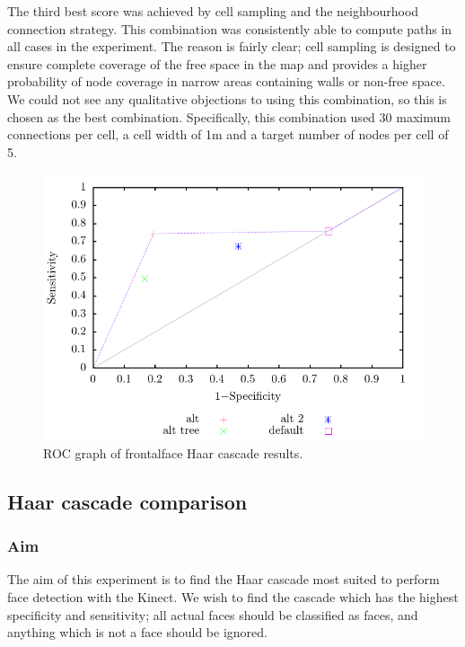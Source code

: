 \documentclass[conference]{IEEEtran}
\begin{document}
The third best score was achieved by cell sampling and the neighbourhood connection strategy. This combination was consistently able to compute paths in all cases in the experiment. The reason is fairly clear; cell sampling is designed to ensure complete coverage of the free space in the map and provides a higher probability of node coverage in narrow areas containing walls or non-free space. We could not see any qualitative objections to using this combination, so this is chosen as the best combination. Specifically, this combination used 30 maximum connections per cell, a cell width of 1m and a target number of nodes per cell of 5.

\begin{figure}
  \includegraphics[width=\columnwidth]{haar_ROC}
  \caption{ROC graph of frontalface Haar cascade results.}
  \label{fig:haar}
\end{figure}
\subsection{Haar cascade comparison}
\subsubsection{Aim}
The aim of this experiment is to find the Haar cascade most suited to perform face detection with the Kinect. We wish to find the cascade which has the highest specificity and sensitivity; all actual faces should be classified as faces, and anything which is not a face should be ignored.
\end{document}
